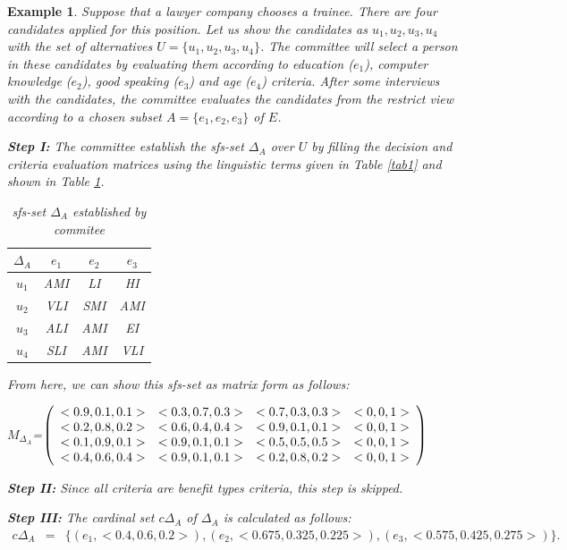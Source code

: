 \documentclass{IJFS}
\newtheorem{ex}[theorem]{Example}
\begin{document}
\begin{ex} Suppose that a lawyer company chooses a trainee. There are four candidates applied for this
position. Let us show the candidates as $u_1, u_2, u_3, u_4$ with
the set of alternatives $U=\{u_1, u_2, u_3, u_4\}$. The committee
will select a person in these candidates by evaluating them
according to education ($e_1$), computer knowledge ($e_2$), good
speaking ($e_3$) and age ($e_4$) criteria. After some interviews
with the candidates, the committee evaluates the candidates from
the restrict view according to a chosen subset $A=\{e_1, e_2,
e_3\}$ of $E$.

\textbf{Step I:} The committee establish the sfs-set $\Delta_A$
over $U$ by filling the decision and criteria evaluation matrices
using the linguistic terms given in Table \ref{tab1} and shown in Table \ref{es}.
\begin{table}[!h] \begin{center} \caption{sfs-set $\Delta_A$ established by commitee \label{es}}
\begin{tabular}{c|c c c}\hline
$\Delta_A$ & $e_1$ & $e_2$ & $e_3$ \\
\hline $u_1$& AMI &LI&HI
\\  $u_2$ &VLI& SMI&AMI\\
 $u_3$&ALI&AMI&EI\\ $u_4$&SLI&AMI&VLI
\end{tabular} \end{center}
\end{table}



From here, we can show this sfs-set as matrix form as follows:
\begin{center}
$M_{\Delta_A}$=$\left(
\begin{array}{c c c c}
<0.9,0.1,0.1> &<0.3,0.7,0.3>&<0.7, 0.3, 0.3>&<0,0,1>\\
<0.2, 0.8,0.2>&<0.6, 0.4,0.4>&<0.9,0.1, 0.1>&<0,0,1>\\
 <0.1, 0.9, 0.1>&<0.9, 0.1,0.1>&<0.5, 0.5, 0.5>&<0,0,1>\\
 <0.4, 0.6, 0.4>&<0.9, 0.1, 0.1>&<0.2, 0.8,
 0.2>&<0,0,1>
\end{array} \right) $
\end{center}


\textbf{Step II:} Since all criteria are benefit types criteria, this step is skipped.

\textbf{Step III:} The cardinal set $c\Delta_A$ of $\Delta_A$ is
calculated as follows:
\begin{eqnarray*} c\Delta_A &=&\{(e_1, <0.4, 0.6, 0.2>), (e_2,<0.675, 0.325, 0.225>),(e_3,<0.575,0.425,0.275>)\}.
\end{eqnarray*}


\end{ex}
\end{document}
